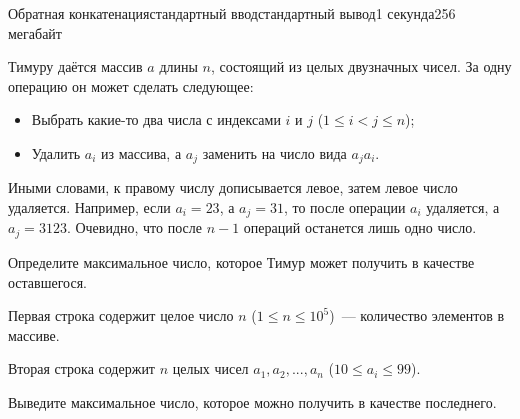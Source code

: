 \begin{problem}{Обратная конкатенация}{стандартный ввод}{стандартный вывод}{1 секунда}{256 мегабайт}

Тимуру даётся массив $a$ длины $n$, состоящий из целых двузначных чисел. За одну операцию он может сделать следующее:

\begin{itemize}
\item Выбрать какие-то два числа с индексами $i$ и $j$ ($1 \leq i < j \leq n$);
\item Удалить $a_i$ из массива, а $a_j$ заменить на число вида $a_ja_i$.
\end{itemize}

Иными словами, к правому числу дописывается левое, затем левое число удаляется. Например, если $a_i=23$, а $a_j=31$, то после операции $a_i$ удаляется, а $a_j=3123$. Очевидно, что после $n-1$ операций останется лишь одно число.

Определите максимальное число, которое Тимур может получить в качестве оставшегося.

\InputFile
Первая строка содержит целое число $n$ ($1 \leq n \leq 10^5$)~--- количество элементов в массиве.

Вторая строка содержит $n$ целых чисел $a_1,a_2,...,a_n$ ($10 \leq a_i \leq 99$).

\OutputFile
Выведите максимальное число, которое можно получить в качестве последнего.

\Examples

\begin{example}
%
%
%
%
\end{example}

\end{problem}

